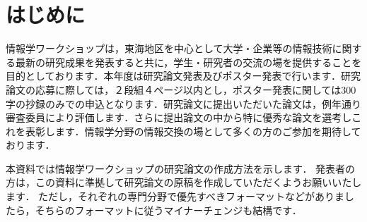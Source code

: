 \section{はじめに}

情報学ワークショップは，東海地区を中心として大学・企業等の情報技術に関する最新の研究成果を発表すると共に，学生・研究者の交流の場を提供することを目的としております．本年度は研究論文発表及びポスター発表で行います．研究論文の応募に際しては，２段組４ページ以内とし，ポスター発表に関しては300字の抄録のみでの申込となります．研究論文に提出いただいた論文は，例年通り審査委員により評価します．さらに提出論文の中から特に優秀な論文を選考しこれを表彰します．情報学分野の情報交換の場として多くの方のご参加を期待しております．

本資料では情報学ワークショップの研究論文の作成方法を示します．
発表者の方は，この資料に準拠して研究論文の原稿を作成していただくようお願いいたします．
ただし，それぞれの専門分野で優先すべきフォーマットなどがありましたら，そちらのフォーマットに従うマイナーチェンジも結構です．
